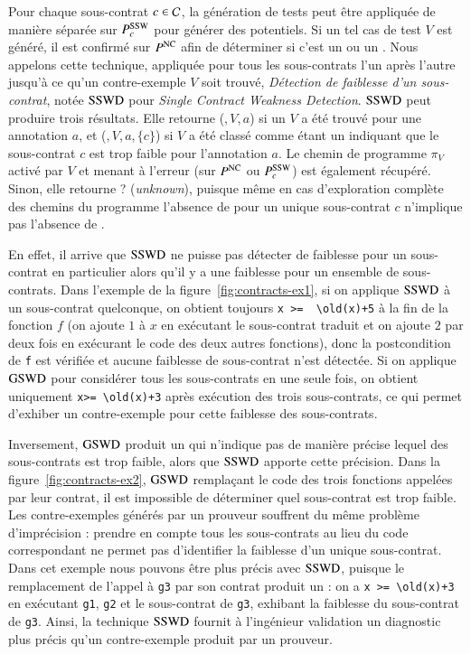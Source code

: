 Pour chaque sous-contrat $c\in{\ensuremath\mathcal{C}}$, la génération de tests peut être appliquée
de manière séparée sur $P_{c}^{\mathrm{SSW}}$ pour générer des \SSWCE potentiels.
Si un tel cas de test $V$ est généré, il est confirmé sur $P^{\mathrm{NC}}$ afin de
déterminer si c'est un \NCCE ou un \SSWCE.
Nous appelons cette technique, appliquée pour tous les sous-contrats l'un après
l'autre jusqu'à ce qu'un contre-exemple $V$ soit trouvé,
\emph{Détection de faiblesse d'un sous-contrat}, notée $\mathrm{SSWD}$ pour
\textit{Single Contract Weakness Detection}.
$\mathrm{SSWD}$ peut produire trois résultats.
Elle retourne (\nc,\,$V$,\,$a$) si un \NCCE $V$ a été trouvé pour une annotation
$a$, et (\cw,\,$V$,\,$a$,\,$\{c\}$) si $V$ a été classé comme étant un \SSWCE
indiquant que le sous-contrat $c$ est trop faible pour l'annotation $a$.
Le chemin de programme $\pi_V$ activé par $V$ et menant à l'erreur (sur $P^{\mathrm{NC}}$
ou $P_c^{\mathrm{SSW}}$) est également récupéré.
Sinon, elle retourne \textsf{?} ({\em unknown}), puisque même en cas
d'exploration complète des chemins du programme l'absence de \SSWCE pour un
unique sous-contrat $c$ n'implique pas l'absence de \GSWCE.

En effet, il arrive que $\mathrm{SSWD}$ ne puisse pas détecter de faiblesse pour un
sous-contrat en particulier alors qu'il y a une faiblesse pour un ensemble de
sous-contrats.
Dans l'exemple de la figure~\ref{fig:contracts-ex1}, si on applique $\mathrm{SSWD}$ à
un sous-contrat quelconque, on obtient toujours \lstinline'x >=  \old(x)+5' à la
fin de la fonction $f$ (on ajoute $1$ à $x$ en exécutant le sous-contrat traduit
et on ajoute $2$ par deux fois en exécurant le code des deux autres fonctions),
donc la postcondition de \lstinline'f' est vérifiée et aucune faiblesse de
sous-contrat n'est détectée.
Si on applique $\mathrm{GSWD}$ pour considérer tous les sous-contrats en une seule fois,
on obtient uniquement \lstinline'x>= \old(x)+3' après exécution des trois
sous-contrats, ce qui permet d'exhiber un contre-exemple pour cette faiblesse
des sous-contrats.

Inversement, $\mathrm{GSWD}$ produit un \GSWCE qui n'indique pas de manière précise
lequel des sous-contrats est trop faible, alors que $\mathrm{SSWD}$ apporte cette
précision.
Dans la figure~\ref{fig:contracts-ex2}, $\mathrm{GSWD}$ remplaçant le code des trois
fonctions appelées par leur contrat, il est impossible de déterminer quel
sous-contrat est trop faible.
Les contre-exemples générés par un prouveur souffrent du même problème
d'imprécision : prendre en compte tous les sous-contrats au lieu du code
correspondant ne permet pas d'identifier la faiblesse d'un unique sous-contrat.
Dans cet exemple nous pouvons être plus précis avec $\mathrm{SSWD}$, puisque le
remplacement de l'appel à \lstinline'g3' par son contrat produit un \SSWCE :
on a \lstinline'x >= \old(x)+3' en exécutant
\lstinline'g1',  \lstinline'g2' et le sous-contrat de \lstinline'g3',
exhibant la faiblesse du sous-contrat de \lstinline'g3'.
Ainsi, la technique $\mathrm{SSWD}$ fournit à l'ingénieur validation un diagnostic plus
précis qu'un contre-exemple produit par un prouveur.

